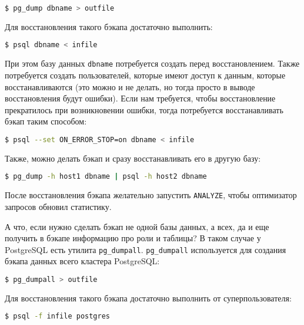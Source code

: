 \begin{lstlisting}[language=Bash,label=lst:backups1,caption=Создаем бэкап с помощью pg\_dump]
$ pg_dump dbname > outfile
\end{lstlisting}

Для восстановления такого бэкапа достаточно выполнить:

\begin{lstlisting}[language=Bash,label=lst:backups2,caption=Восстанавливаем бэкап]
$ psql dbname < infile
\end{lstlisting}

При этом базу данных \lstinline!dbname! потребуется создать перед восстановлением. Также потребуется создать пользователей, которые имеют доступ к данным, которые восстанавливаются (это можно и не делать, но тогда просто в выводе восстановления будут ошибки). Если нам требуется, чтобы восстановление прекратилось при возникновении ошибки, тогда потребуется восстанавливать бэкап таким способом:

\begin{lstlisting}[language=Bash,label=lst:backups3,caption=Восстанавливаем бэкап]
$ psql --set ON_ERROR_STOP=on dbname < infile
\end{lstlisting}

Также, можно делать бэкап и сразу восстанавливать его в другую базу:

\begin{lstlisting}[language=Bash,label=lst:backups4,caption=Бекап в другую БД]
$ pg_dump -h host1 dbname | psql -h host2 dbname
\end{lstlisting}

После восстановления бэкапа желательно запустить \lstinline!ANALYZE!, чтобы оптимизатор запросов обновил статистику.

А что, если нужно сделать бэкап не одной базы данных, а всех, да и еще получить в бэкапе информацию про роли и таблицы? В таком случае у PostgreSQL есть утилита \lstinline!pg_dumpall!. \lstinline!pg_dumpall! используется для создания бэкапа данных всего кластера PostgreSQL:

\begin{lstlisting}[language=Bash,label=lst:backups5,caption=Бекап кластера PostgreSQL]
$ pg_dumpall > outfile
\end{lstlisting}

Для восстановления такого бэкапа достаточно выполнить от суперпользователя:

\begin{lstlisting}[language=Bash,label=lst:backups6,caption=Восстановления бэкапа PostgreSQL]
$ psql -f infile postgres
\end{lstlisting}


